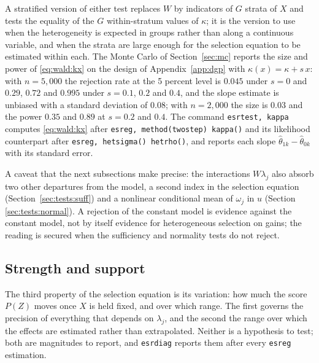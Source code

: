 \documentclass[11pt,a4paper]{article}
\theoremstyle{plain}
\theoremstyle{definition}
\theoremstyle{remark}
\newcommand{\1}{\mathbf{1}}
\newcommand{\cmd}[1]{\texttt{#1}}
\newcommand{\kX}{\kappa(x)}
\begin{document}
A stratified version of either test replaces $W$ by indicators of $G$
strata of $X$ and tests the equality of the $G$ within-stratum values of
$\kappa$; it is the version to use when the heterogeneity is expected in
groups rather than along a continuous variable, and when the strata are
large enough for the selection equation to be estimated within each. The
Monte Carlo of Section~\ref{sec:mc} reports the size and power of
\eqref{eq:wald:kx} on the design of Appendix~\ref{app:dgp} with
$\kX=\kappa+s\,x$: with $n=5{,}000$ the rejection rate at the 5 percent
level is $0.045$ under $s=0$ and $0.29$, $0.72$ and $0.995$ under
$s=0.1$, $0.2$ and $0.4$, and the slope estimate is unbiased with a
standard deviation of $0.08$; with $n=2{,}000$ the size is $0.03$ and the
power $0.35$ and $0.89$ at $s=0.2$ and $0.4$. The command
\cmd{esrtest, kappa} computes \eqref{eq:wald:kx} after
\cmd{esreg, method(twostep) kappa()} and its likelihood counterpart after
\cmd{esreg, hetsigma() hetrho()}, and reports each slope
$\hat\theta_{1k}-\hat\theta_{0k}$ with its standard error.

A caveat that the next subsections make precise: the interactions
$W\lambda_j$ also absorb two other departures from the model, a second
index in the selection equation (Section~\ref{sec:tests:suff}) and a
nonlinear conditional mean of $\omega_j$ in $u$ (Section~%
\ref{sec:tests:normal}). A rejection of the constant model is evidence
against the constant model, not by itself evidence for heterogeneous
selection on gains; the reading is secured when the sufficiency and
normality tests do not reject.

\subsection{Strength and support}\label{sec:tests:strength}

The third property of the selection equation is its variation: how much
the score $P(Z)$ moves once $X$ is held fixed, and over which range. The
first governs the precision of everything that depends on $\lambda_j$, and
the second the range over which the effects are estimated rather than
extrapolated. Neither is a hypothesis to test; both are magnitudes to
report, and \cmd{esrdiag} reports them after every \cmd{esreg} estimation.
\end{document}

